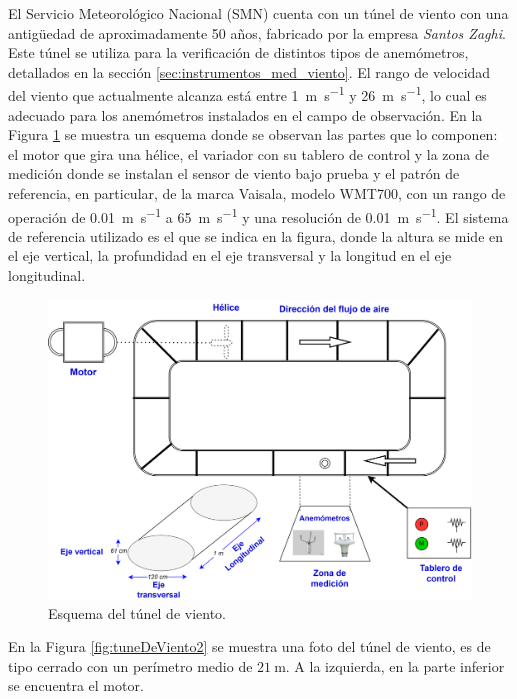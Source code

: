El Servicio Meteorológico Nacional (SMN) cuenta con un túnel de viento con una antigüedad de aproximadamente 50 años, fabricado por la empresa \textit{Santos Zaghi}. Este túnel se utiliza para la verificación de distintos tipos de anemómetros, detallados en la sección \ref{sec:instrumentos_med_viento}. El rango de velocidad del viento que actualmente alcanza está entre \SI{1}{\meter\per\second} y \SI{26}{\meter\per\second}, lo cual es adecuado para los anemómetros instalados en el campo de observación. En la Figura \ref{fig:tunelVientoEsquema} se muestra un esquema donde se observan las partes que lo componen: el motor que gira una hélice, el variador con su tablero de control y la zona de medición donde se instalan el sensor de viento bajo prueba y el patrón de referencia, en particular, de la marca Vaisala, modelo WMT700, con un rango de operación de \SI{0.01}{\meter\per\second} a \SI{65}{\meter\per\second} y una resolución de \SI{0.01}{\meter\per\second}. El sistema de referencia utilizado es el que se indica en la figura, donde la altura se mide en el eje vertical, la profundidad en el eje transversal y la longitud en el eje longitudinal.

\begin{figure}[H]
    \centering
    \includegraphics[width=0.9\linewidth]{Figuras/viento/tunelDeViento/TunelVientoEsquema.png}
    \caption{Esquema del túnel de viento.}
    \label{fig:tunelVientoEsquema}
\end{figure}

En la Figura \ref{fig:tuneDeViento2} se muestra una foto del túnel de viento, es de tipo cerrado con un perímetro medio de $\SI{21}{\meter}$. A la izquierda, en la parte inferior se encuentra el motor.

